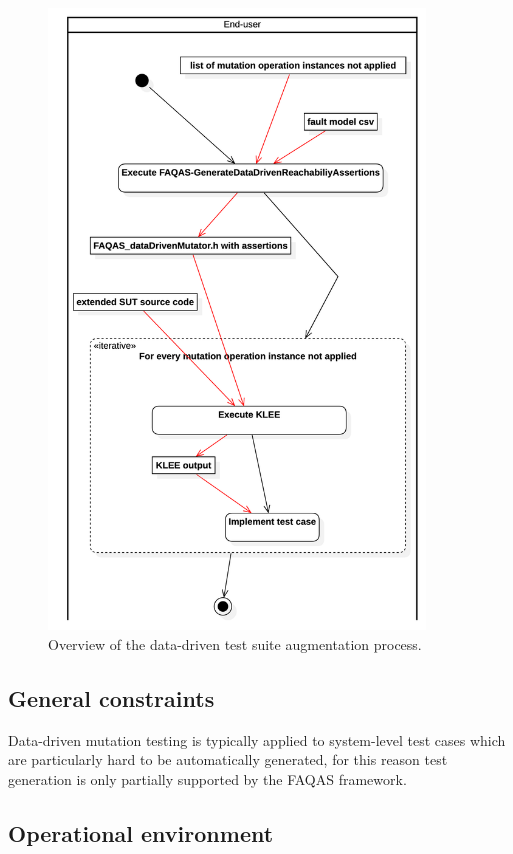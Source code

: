 \begin{figure}[h]
  \centering
	\includegraphics[width=10cm]{images/png/Activity1!DataDrivenTestSuiteAugmentation_4.png}
      \caption{Overview of the data-driven test suite augmentation process.}
      \label{fig:process:dataDriven:augment}
\end{figure}



\clearpage
\subsection{General constraints}

\RQ{} Data-driven mutation testing is typically applied to system-level test cases which are particularly hard to be automatically generated, for this reason test generation is only partially supported by the FAQAS framework.



\subsection{Operational environment}

